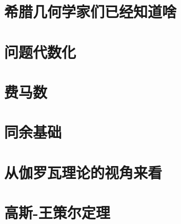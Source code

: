 \documentclass[cn,fancy,blue,11pt]{elegantbook}
\begin{document}
\section{希腊几何学家们已经知道啥}

\section{问题代数化}

\section{费马数}

\section{同余基础}

\section{从伽罗瓦理论的视角来看}

\section{高斯-王策尔定理}
\end{document}
